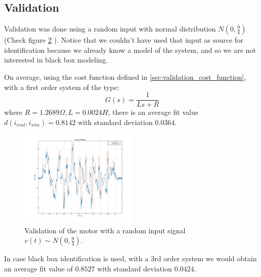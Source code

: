 \begin{figure}[!tbh]
  \centering
  \hfill
  \caption{}
    \label{fig:motorid}
\end{figure}
\subsection{Validation}
\label{sec:validation}
Validation was done using a random input with normal distribution $N(0,\frac{9}{4})$ (Check figure \ref{fig:motor_validation} ). Notice that we couldn't have used that input as source for identification because we already know a model of the system, and so we are not interested in black box modeling. 

On average, using the cost function defined in \ref{sec:validation_cost_function}, with a first order system of the type:
$$G(s) = \frac{1}{Ls+R}$$
where $R=1.2689 \Omega, L=0.0024 H$, there is an average fit value $d(i_{real},i_{sim})=0.8142$ with standard deviation $0.0364$.
\begin{figure}[!h]
    \centering
    \includegraphics[width=0.5\textwidth]{img/motor_validation.png}
    \caption{Validation of the motor with a random input signal $v(t) \sim N(0,\frac{9}{4})$.}
    \label{fig:motor_validation}
\end{figure}
In case black box identification is used, with a $3$rd order system we would obtain an average fit value of $0.8527$ with standard deviation $0.0424$. \\ \\
\newpage
